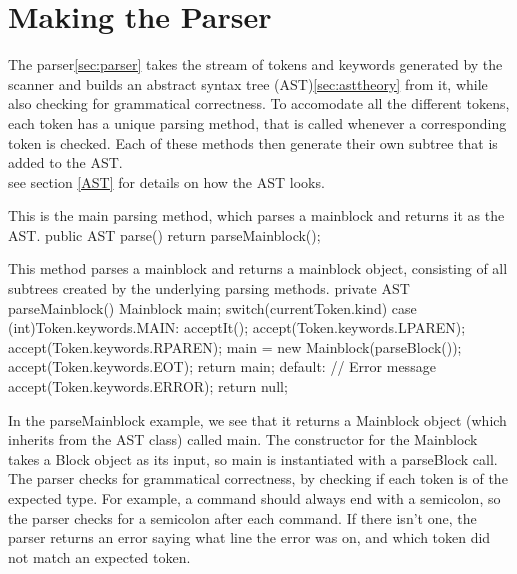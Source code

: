 \section{Making the Parser}
The parser\ref{sec:parser} takes the stream of tokens and keywords generated by the scanner and builds an abstract syntax tree (AST)\ref{sec:asttheory} from it, while also checking for grammatical correctness.
To accomodate all the different tokens, each token has a unique parsing method, that is called whenever a corresponding token is checked.
Each of these methods then generate their own subtree that is added to the AST. \\
see section \ref{AST} for details on how the AST looks.

\begin{source}{}{This is the main parsing method, which parses a mainblock and returns it as the AST.}{}
public AST parse()
        {
            return parseMainblock();
        }
\end{source}
\begin{source}{}{This method parses a mainblock and returns a mainblock object, consisting of all subtrees created by the underlying parsing methods.}{}
private AST parseMainblock()
        {
            Mainblock main;
            switch(currentToken.kind)
            {
                case (int)Token.keywords.MAIN:
                    acceptIt();
                    accept(Token.keywords.LPAREN);
                    accept(Token.keywords.RPAREN);
                    main = new Mainblock(parseBlock());
                    accept(Token.keywords.EOT);
                    return main;
                default:
                    // Error message
                    accept(Token.keywords.ERROR);
                    return null;
            }
        }
\end{source}
In the parseMainblock example, we see that it returns a Mainblock object (which inherits from the AST class) called main. 
The constructor for the Mainblock takes a Block object as its input, so main is instantiated with a parseBlock call. \\
The parser checks for grammatical correctness, by checking if each token is of the expected type. 
For example, a command should always end with a semicolon, so the parser checks for a semicolon after each command. 
If there isn't one, the parser returns an error saying what line the error was on, and which token did not match an expected token.